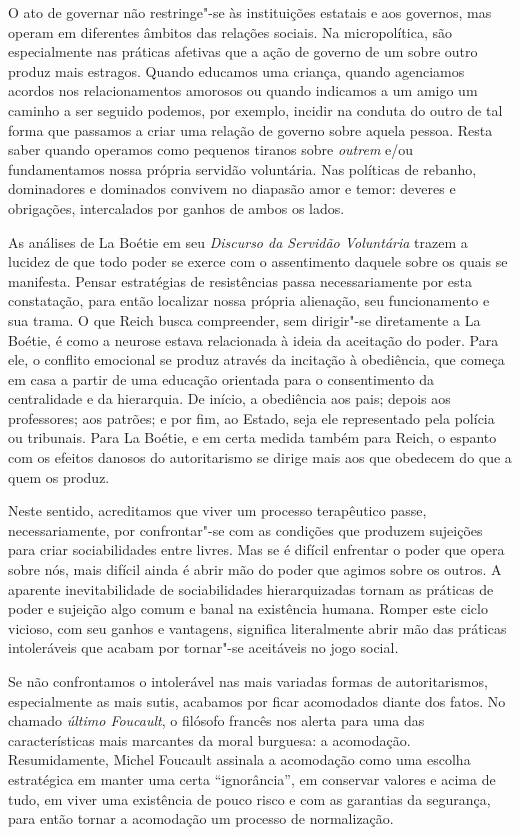 O ato de governar não restringe"-se às instituições estatais e aos
governos, mas operam em diferentes âmbitos das relações sociais. Na
micropolítica, são especialmente nas práticas afetivas que a ação de
governo de um sobre outro produz mais estragos. Quando educamos uma
criança, quando agenciamos acordos nos relacionamentos amorosos ou
quando indicamos a um amigo um caminho a ser seguido podemos, por
exemplo, incidir na conduta do outro de tal forma que passamos a criar
uma relação de governo sobre aquela pessoa. Resta saber quando operamos
como pequenos tiranos sobre \emph{outrem} e/ou fundamentamos nossa
própria servidão voluntária. Nas políticas de rebanho, dominadores e
dominados convivem no diapasão amor e temor: deveres e obrigações,
intercalados por ganhos de ambos os lados.

As análises de La Boétie em seu \emph{Discurso da Servidão Voluntária}
trazem a lucidez de que todo poder se exerce com o assentimento daquele
sobre os quais se manifesta. Pensar estratégias de resistências passa
necessariamente por esta constatação, para então localizar nossa própria
alienação, seu funcionamento e sua trama. O que Reich busca compreender,
sem dirigir"-se diretamente a La Boétie, é como a neurose estava
relacionada à ideia da aceitação do poder. Para ele, o conflito
emocional se produz através da incitação à obediência, que começa em
casa a partir de uma educação orientada para o consentimento da
centralidade e da hierarquia. De início, a obediência aos pais; depois
aos professores; aos patrões; e por fim, ao Estado, seja ele
representado pela polícia ou tribunais. Para La Boétie, e em certa
medida também para Reich, o espanto com os efeitos danosos do
autoritarismo se dirige mais aos que obedecem do que a quem os produz.

Neste sentido, acreditamos que viver um processo terapêutico passe,
necessariamente, por confrontar"-se com as condições que produzem
sujeições para criar sociabilidades entre livres. Mas se é difícil
enfrentar o poder que opera sobre nós, mais difícil ainda é abrir mão do
poder que agimos sobre os outros. A aparente inevitabilidade de
sociabilidades hierarquizadas tornam as práticas de poder e sujeição
algo comum e banal na existência humana. Romper este ciclo
vicioso, com seu ganhos e vantagens, significa literalmente abrir mão
das práticas intoleráveis que acabam por tornar"-se aceitáveis no jogo
social.

Se não confrontamos o intolerável nas mais variadas formas de
autoritarismos, especialmente as mais sutis, acabamos por ficar
acomodados diante dos fatos. No chamado \emph{último Foucault}, o %
filósofo francês nos alerta para uma das características mais marcantes
da moral burguesa: a acomodação. Resumidamente, Michel Foucault assinala
a acomodação como uma escolha estratégica em manter uma certa
``ignorância'', em conservar valores e acima de tudo, em viver uma
existência de pouco risco e com as garantias da segurança, para então
tornar a acomodação um processo de normalização.

